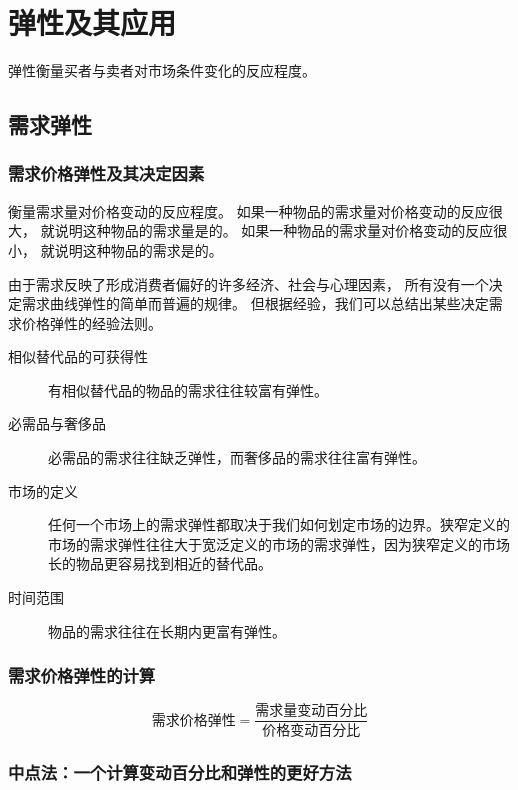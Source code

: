 
\chapter{弹性及其应用}

弹性衡量买者与卖者对市场条件变化的反应程度。

\section{需求弹性}

\subsection{需求价格弹性及其决定因素}

衡量需求量对价格变动的反应程度。
如果一种物品的需求量对价格变动的反应很大，
就说明这种物品的需求量是的。
如果一种物品的需求量对价格变动的反应很小，
就说明这种物品的需求是的。


由于需求反映了形成消费者偏好的许多经济、社会与心理因素，
所有没有一个决定需求曲线弹性的简单而普遍的规律。
但根据经验，我们可以总结出某些决定需求价格弹性的经验法则。

\begin{description}
\item[相似替代品的可获得性] 有相似替代品的物品的需求往往较富有弹性。
\item[必需品与奢侈品] 必需品的需求往往缺乏弹性，而奢侈品的需求往往富有弹性。
\item[市场的定义] 任何一个市场上的需求弹性都取决于我们如何划定市场的边界。狭窄定义的市场的需求弹性往往大于宽泛定义的市场的需求弹性，因为狭窄定义的市场长的物品更容易找到相近的替代品。
\item[时间范围] 物品的需求往往在长期内更富有弹性。
\end{description}



\subsection{需求价格弹性的计算}

\begin{equation}
  \text{需求价格弹性} = \frac{\text{需求量变动百分比}}{\text{价格变动百分比}}
\end{equation}



\subsection{中点法：一个计算变动百分比和弹性的更好方法}

